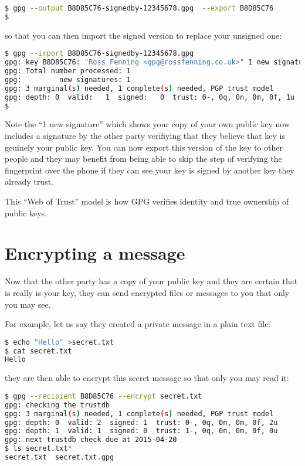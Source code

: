 \documentclass{report}
\begin{document}
\begin{lstlisting}[language=bash]
$ gpg --output B8D85C76-signedby-12345678.gpg  --export B8D85C76
$
\end{lstlisting}

\noindent so that you can then import the signed version to replace your
unsigned one:

\begin{lstlisting}[language=bash]
$ gpg --import B8D85C76-signedby-12345678.gpg
gpg: key B8D85C76: "Ross Fenning <gpg@rossfenning.co.uk>" 1 new signature
gpg: Total number processed: 1
gpg:         new signatures: 1
gpg: 3 marginal(s) needed, 1 complete(s) needed, PGP trust model
gpg: depth: 0  valid:   1  signed:   0  trust: 0-, 0q, 0n, 0m, 0f, 1u
$
\end{lstlisting}

Note the ``1 new signature'' which shows your copy of your own public key
now includes a signature by the other party verifiying that they
believe that key is geuinely your public key. You can now export this
version of the key to other people and they may benefit from being able
to skip the step of verifying the fingerprint over the phone if they
can see your key is signed by another key they already trust.

This ``Web of Trust'' model is how GPG verifies identity and true ownership
of public keys.

\section{Encrypting a message}

Now that the other party has a copy of your public key and they are certain
that is really is your key, they can send encrypted files or messages to
you that only you may see.

For example, let us say they created a private message in a plain text file:

\begin{lstlisting}[language=bash]
$ echo "Hello" >secret.txt
$ cat secret.txt 
Hello
\end{lstlisting}

\noindent they are then able to encrypt this secret message so that only you may read it:

\begin{lstlisting}[language=bash]
$ gpg --recipient B8D85C76 --encrypt secret.txt
gpg: checking the trustdb
gpg: 3 marginal(s) needed, 1 complete(s) needed, PGP trust model
gpg: depth: 0  valid: 2  signed: 1  trust: 0-, 0q, 0n, 0m, 0f, 2u
gpg: depth: 1  valid: 1  signed: 0  trust: 1-, 0q, 0n, 0m, 0f, 0u
gpg: next trustdb check due at 2015-04-20
$ ls secret.txt*
secret.txt  secret.txt.gpg
\end{lstlisting}
\end{document}
